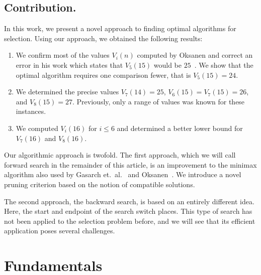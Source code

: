 \documentclass[twoside,leqno,twocolumn]{article}
\begin{document}
\subsection{Contribution.}
In this work, we present a novel approach to finding optimal algorithms for selection.
Using our approach, we obtained the following results:
\begin{enumerate}
  \item We confirm most of the values $V_i(n)$ computed by Oksanen and correct an error in his work which states that $V_5(15)$ would be $25$~\cite{Oksanen}.
        We show that the optimal algorithm requires one comparison fewer, that is $V_5(15) = 24$.
  \item We determined the precise values $V_7(14) = 25$, $V_6(15) = V_7(15) = 26$, and $V_8(15) = 27$.
        Previously, only a range of values was known for these instances.
  \item We computed $V_i(16)$ for $i \leq 6$ and determined a better lower bound for $V_7(16)$ and $V_8(16)$.
\end{enumerate}

Our algorithmic approach is twofold.
The first approach, which we will call forward search in the remainder of this article, is an improvement to the minimax algorithm also used by Gasarch et.\ al\@.~\cite{Gasarch1996} and Oksanen~\cite{Oksanen,Oksanen2006}.
We introduce a novel pruning criterion based on the notion of compatible solutions.

The second approach, the backward search, is based on an entirely different idea.
Here, the start and endpoint of the search switch places.
This type of search has not been applied to the selection problem before, and we will see that its efficient application poses several challenges.

\section{Fundamentals}
\end{document}
